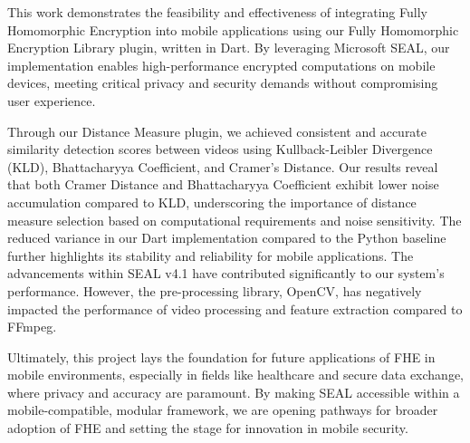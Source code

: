 This work demonstrates the feasibility and effectiveness of integrating Fully Homomorphic Encryption into mobile applications using our Fully Homomorphic Encryption Library plugin, written in Dart. By leveraging Microsoft SEAL, our implementation enables high-performance encrypted computations on mobile devices, meeting critical privacy and security demands without compromising user experience.

Through our Distance Measure plugin, we achieved consistent and accurate similarity detection scores between videos using Kullback-Leibler Divergence (KLD), Bhattacharyya Coefficient, and Cramer’s Distance. Our results reveal that both Cramer Distance and Bhattacharyya Coefficient exhibit lower noise accumulation compared to KLD, underscoring the importance of distance measure selection based on computational requirements and noise sensitivity. The reduced variance in our Dart implementation compared to the Python baseline further highlights its stability and reliability for mobile applications. The advancements within SEAL v4.1 have contributed significantly to our system’s performance. However, the pre-processing library, OpenCV, has negatively impacted the performance of video processing and feature extraction compared to FFmpeg.

Ultimately, this project lays the foundation for future applications of FHE in mobile environments, especially in fields like healthcare and secure data exchange, where privacy and accuracy are paramount. By making SEAL accessible within a mobile-compatible, modular framework, we are opening pathways for broader adoption of FHE and setting the stage for innovation in mobile security.

